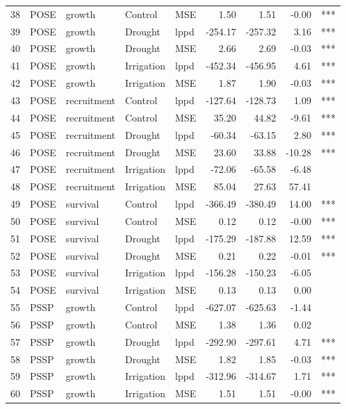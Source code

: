 \begin{longtable}{rllllrrrl}
  38 & POSE & growth & Control & MSE & 1.50 & 1.51 & -0.00 & *** \\ 
  39 & POSE & growth & Drought & lppd & -254.17 & -257.32 & 3.16 & *** \\ 
  40 & POSE & growth & Drought & MSE & 2.66 & 2.69 & -0.03 & *** \\ 
  41 & POSE & growth & Irrigation & lppd & -452.34 & -456.95 & 4.61 & *** \\ 
  42 & POSE & growth & Irrigation & MSE & 1.87 & 1.90 & -0.03 & *** \\ 
  43 & POSE & recruitment & Control & lppd & -127.64 & -128.73 & 1.09 & *** \\ 
  44 & POSE & recruitment & Control & MSE & 35.20 & 44.82 & -9.61 & *** \\ 
  45 & POSE & recruitment & Drought & lppd & -60.34 & -63.15 & 2.80 & *** \\ 
  46 & POSE & recruitment & Drought & MSE & 23.60 & 33.88 & -10.28 & *** \\ 
  47 & POSE & recruitment & Irrigation & lppd & -72.06 & -65.58 & -6.48 &  \\ 
  48 & POSE & recruitment & Irrigation & MSE & 85.04 & 27.63 & 57.41 &  \\ 
  49 & POSE & survival & Control & lppd & -366.49 & -380.49 & 14.00 & *** \\ 
  50 & POSE & survival & Control & MSE & 0.12 & 0.12 & -0.00 & *** \\ 
  51 & POSE & survival & Drought & lppd & -175.29 & -187.88 & 12.59 & *** \\ 
  52 & POSE & survival & Drought & MSE & 0.21 & 0.22 & -0.01 & *** \\ 
  53 & POSE & survival & Irrigation & lppd & -156.28 & -150.23 & -6.05 &  \\ 
  54 & POSE & survival & Irrigation & MSE & 0.13 & 0.13 & 0.00 &  \\ 
  55 & PSSP & growth & Control & lppd & -627.07 & -625.63 & -1.44 &  \\ 
  56 & PSSP & growth & Control & MSE & 1.38 & 1.36 & 0.02 &  \\ 
  57 & PSSP & growth & Drought & lppd & -292.90 & -297.61 & 4.71 & *** \\ 
  58 & PSSP & growth & Drought & MSE & 1.82 & 1.85 & -0.03 & *** \\ 
  59 & PSSP & growth & Irrigation & lppd & -312.96 & -314.67 & 1.71 & *** \\ 
  60 & PSSP & growth & Irrigation & MSE & 1.51 & 1.51 & -0.00 & *** \\ 

\end{longtable}
